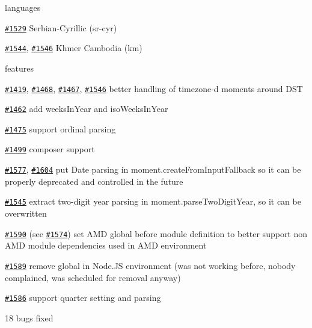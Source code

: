 \begin{DoxyItemize}
\item languages
\begin{DoxyItemize}
\item \href{https://github.com/moment/moment/issues/1529}{\tt \#1529} Serbian-\/\+Cyrillic (sr-\/cyr)
\item \href{https://github.com/moment/moment/issues/1544}{\tt \#1544}, \href{https://github.com/moment/moment/issues/1546}{\tt \#1546} Khmer Cambodia (km)
\end{DoxyItemize}
\item features
\begin{DoxyItemize}
\item \href{https://github.com/moment/moment/issues/1419}{\tt \#1419}, \href{https://github.com/moment/moment/issues/1468}{\tt \#1468}, \href{https://github.com/moment/moment/issues/1467}{\tt \#1467}, \href{https://github.com/moment/moment/issues/1546}{\tt \#1546} better handling of timezone-\/d moments around D\+ST
\item \href{https://github.com/moment/moment/issues/1462}{\tt \#1462} add weeks\+In\+Year and iso\+Weeks\+In\+Year
\item \href{https://github.com/moment/moment/issues/1475}{\tt \#1475} support ordinal parsing
\item \href{https://github.com/moment/moment/issues/1499}{\tt \#1499} composer support
\item \href{https://github.com/moment/moment/issues/1577}{\tt \#1577}, \href{https://github.com/moment/moment/issues/1604}{\tt \#1604} put Date parsing in moment.\+create\+From\+Input\+Fallback so it can be properly deprecated and controlled in the future
\item \href{https://github.com/moment/moment/issues/1545}{\tt \#1545} extract two-\/digit year parsing in moment.\+parse\+Two\+Digit\+Year, so it can be overwritten
\item \href{https://github.com/moment/moment/issues/1590}{\tt \#1590} (see \href{https://github.com/moment/moment/issues/1574}{\tt \#1574}) set A\+MD global before module definition to better support non A\+MD module dependencies used in A\+MD environment
\item \href{https://github.com/moment/moment/issues/1589}{\tt \#1589} remove global in Node.\+JS environment (was not working before, nobody complained, was scheduled for removal anyway)
\item \href{https://github.com/moment/moment/issues/1586}{\tt \#1586} support quarter setting and parsing
\end{DoxyItemize}
\item 18 bugs fixed
\end{DoxyItemize}

